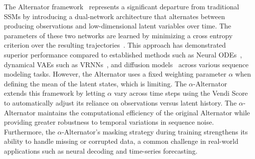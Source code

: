  The Alternator framework~\citep{rezaei2024alternators} represents a significant departure from traditional SSMs by introducing a dual-network architecture that alternates between producing observations and low-dimensional latent variables over time. The parameters of these two networks are learned by minimizing a cross entropy criterion over the resulting trajectories~\citep{rezaei2024alternators}. This approach has demonstrated superior performance compared to established methods such as Neural ODEs~\citep{chen2018neural}, dynamical VAEs such as VRNNs~\citep{gregor2014deep}, and diffusion models~\citep{dutordoir2022neural, lin2023diffusion} across various sequence modeling tasks. However, the Alternator uses a fixed weighting parameter $\alpha$ when defining the mean of the latent states, which is limiting. The $\alpha$-Alternator extends this framework by letting $\alpha$ vary across time steps using the Vendi Score to automatically adjust its reliance on observations versus latent history. The $\alpha$-Alternator maintains the computational efficiency of the original Alternator while providing greater robustness to temporal variations in sequence noise. Furthermore, the $\alpha$-Alternator's masking strategy during training strengthens its ability to handle missing or corrupted data, a common challenge in real-world applications such as neural decoding and time-series forecasting.